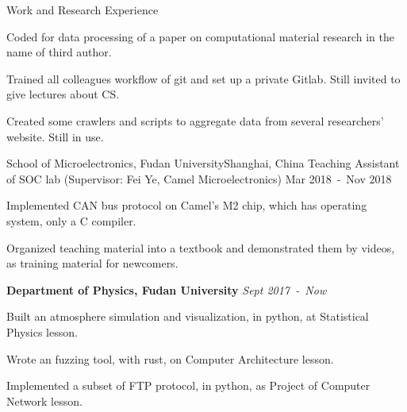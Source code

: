 \documentclass{resume} %
\begin{document}
\begin{rSection}{Work and Research Experience}
\begin{rSubsection}
\item Coded for data processing of a paper on computational material research in the name of third author.
\item Trained all colleagues workflow of git and set up a private Gitlab. Still invited to give lectures about CS.
\item Created some crawlers and scripts to aggregate data from several researchers' website. Still in use.


\end{rSubsection}



\begin{rSubsection}
{School of Microelectronics, Fudan University}{Shanghai, China}
{Teaching Assistant of SOC lab (Supervisor: Fei Ye, Camel Microelectronics)}
{Mar 2018\ -\ Nov 2018}

\item Implemented CAN bus protocol on Camel's M2 chip, which has operating system, only a C compiler.

\item Organized teaching material into a textbook and demonstrated them by videos, as training material for newcomers.
 
\end{rSubsection}

{\bf Department of Physics, Fudan University } \hfill {\em Sept 2017\ -\ Now}
\begin{myItemize}
\item Built an atmosphere simulation and visualization, in python, at Statistical Physics lesson.
\item Wrote an fuzzing tool, with rust,  on Computer Architecture lesson.
\item Implemented a subset of FTP protocol, in python, as Project of Computer Network lesson.
\end{myItemize}
\end{rSection}

\end{document}
